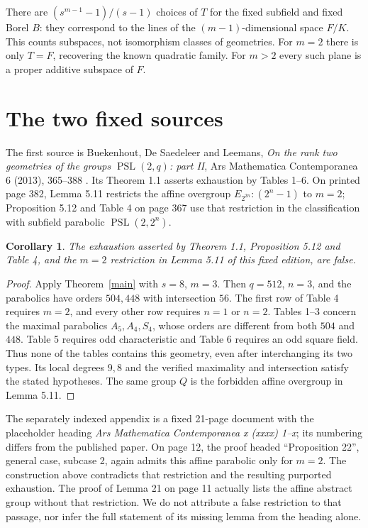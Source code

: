 \documentclass[11pt]{article}
\newtheorem{corollary}[theorem]{Corollary}
\newcommand{\PS}{\operatorname{PSL}}
\begin{document}
There are $(s^{m-1}-1)/(s-1)$ choices of $T$ for the fixed subfield and
fixed Borel $B$: they correspond to the lines of the $(m-1)$-dimensional
space $F/K$. This counts subspaces, not isomorphism classes of geometries.
For $m=2$ there is only $T=F$, recovering the known quadratic family.
For $m>2$ every such plane is a proper additive subspace of $F$.

\section{The two fixed sources}
The first source is Buekenhout, De Saedeleer and Leemans,
\emph{On the rank two geometries of the groups $\PS(2,q)$: part II},
Ars Mathematica Contemporanea 6 (2013), 365--388 \cite{partii}.
Its Theorem 1.1 asserts exhaustion by Tables 1--6. On printed page 382,
Lemma 5.11 restricts the affine overgroup $E_{2^{2n}}:(2^n-1)$ to $m=2$;
Proposition 5.12 and Table 4 on page 367 use that restriction in the
classification with subfield parabolic $\PS(2,2^n)$.

\begin{corollary}
The exhaustion asserted by Theorem 1.1, Proposition 5.12 and Table 4,
and the $m=2$ restriction in Lemma 5.11 of this fixed edition, are false.
\end{corollary}
\begin{proof}
Apply Theorem~\ref{main} with $s=8$, $m=3$. Then $q=512$, $n=3$,
and the parabolics have orders $504,448$ with intersection $56$.
The first row of Table 4 requires $m=2$, and every other row requires
$n=1$ or $n=2$. Tables 1--3 concern the maximal parabolics
$A_5,A_4,S_4$, whose orders are different from both $504$ and $448$.
Table 5 requires odd characteristic and Table 6 requires an odd square
field. Thus none of the tables contains this geometry, even after
interchanging its two types. Its local degrees $9,8$ and the verified
maximality and intersection satisfy the stated hypotheses. The same
group $Q$ is the forbidden affine overgroup in Lemma 5.11.
\end{proof}

The separately indexed appendix \cite{appendix} is a fixed 21-page
document with the placeholder heading \emph{Ars Mathematica Contemporanea
x (xxxx) 1--x}; its numbering differs from the published paper.
On page 12, the proof headed ``Proposition 22'', general case, subcase 2,
again admits this affine parabolic only for $m=2$. The construction above
contradicts that restriction and the resulting purported exhaustion.
The proof of Lemma 21 on page 11 actually lists the affine abstract
group without that restriction. We do not attribute a false restriction
to that passage, nor infer the full statement of its missing lemma from
the heading alone.
\end{document}
